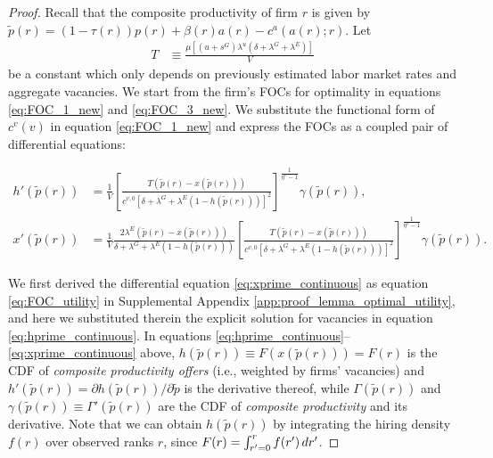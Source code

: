 \begin{proof}
    Recall that the composite productivity of firm $r$ is given by $\tilde{p}(r) = (1 - \tau(r)) p(r) + \beta(r) a(r) - c^{a}(a(r);r)$. Let
    \begin{align}
        T &\equiv \frac{\mu [(u + s^{G}) \lambda^{u} (\delta + \lambda^{G} + \lambda^{E})]}{V} \label{eq:constant_T}
    \end{align}
    be a constant which only depends on previously estimated labor market rates and aggregate vacancies. We start from the firm's FOCs for optimality in equations \eqref{eq:FOC_1_new} and \eqref{eq:FOC_3_new}. We substitute the functional form of $c^{v}(v)$ in equation \eqref{eq:FOC_1_new} and express the FOCs as a coupled pair of differential equations:
    \begin{small}
        \begin{align}
            h'(\tilde{p}(r)) &= \frac{1}{V}\left[\frac{T(\tilde{p}(r)-x(\tilde{p}(r)))}{c^{v,0}\left[\delta+\lambda^{G}+\lambda^{E}(1-h(\tilde{p}(r)))\right]^{2}}\right]^{\frac{1}{\eta^{v}-1}}\gamma(\tilde{p}(r)), \label{eq:hprime_continuous} \\
            x'(\tilde{p}(r)) &=\frac{1}{V}\frac{2\lambda^{E}(\tilde{p}(r)-x(\tilde{p}(r)))}{\delta+\lambda^{G}+\lambda^{E}(1-h(\tilde{p}(r)))}\left[\frac{T(\tilde{p}(r)-x(\tilde{p}(r)))}{c^{v,0}\left[\delta+\lambda^{G}+\lambda^{E}(1-h(\tilde{p}(r)))\right]^{2}}\right]^{\frac{1}{\eta^{v}-1}}\gamma(\tilde{p}(r)). \label{eq:xprime_continuous}
        \end{align}
    \end{small}
    We first derived the differential equation \eqref{eq:xprime_continuous} as equation \eqref{eq:FOC_utility} in Supplemental Appendix \ref{app:proof_lemma_optimal_utility}, and here we substituted therein the explicit solution for vacancies in equation \eqref{eq:hprime_continuous}. In equations \eqref{eq:hprime_continuous}--\eqref{eq:xprime_continuous} above, $h(\tilde{p}(r)) \equiv F(x(\tilde{p}(r))) = F(r)$ is the CDF of \emph{composite productivity offers} (i.e., weighted by firms' vacancies) and $h'(\tilde{p}(r)) = \partial h(\tilde{p}(r)) / \partial \tilde{p}$ is the derivative thereof, while $\Gamma(\tilde{p}(r))$ and $\gamma(\tilde{p}(r)) \equiv \Gamma'(\tilde{p}(r))$ are the CDF of \emph{composite productivity} and its derivative. Note that we can obtain $h(\tilde{p}(r))$ by integrating the hiring density $f(r)$ over observed ranks $r$, since $F(r) = \int_{r'=0}^{r} f(r') \mathop{}\!{d} r'$.


\end{proof}
